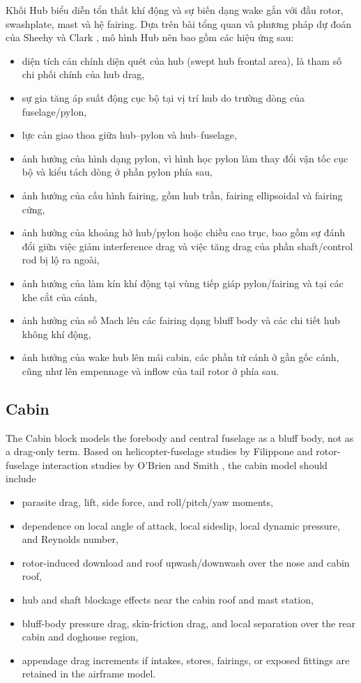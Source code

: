 \documentclass[12pt,a4paper]{article}
\begin{document}
Khối Hub biểu diễn tổn thất khí động và sự biến dạng wake gắn với đầu rotor, swashplate, mast và hệ fairing. Dựa trên bài tổng quan và phương pháp dự đoán của Sheehy và Clark \cite{Sheehy1976}, mô hình Hub nên bao gồm các hiệu ứng sau:
\begin{itemize}
  \item diện tích cản chính diện quét của hub (swept hub frontal area), là tham số chi phối chính của hub drag,
  \item sự gia tăng áp suất động cục bộ tại vị trí hub do trường dòng của fuselage/pylon,
  \item lực cản giao thoa giữa hub--pylon và hub--fuselage,
  \item ảnh hưởng của hình dạng pylon, vì hình học pylon làm thay đổi vận tốc cục bộ và kiểu tách dòng ở phần pylon phía sau,
  \item ảnh hưởng của cấu hình fairing, gồm hub trần, fairing ellipsoidal và fairing cứng,
  \item ảnh hưởng của khoảng hở hub/pylon hoặc chiều cao trục, bao gồm sự đánh đổi giữa việc giảm interference drag và việc tăng drag của phần shaft/control rod bị lộ ra ngoài,
  \item ảnh hưởng của làm kín khí động tại vùng tiếp giáp pylon/fairing và tại các khe cắt của cánh,
  \item ảnh hưởng của số Mach lên các fairing dạng bluff body và các chi tiết hub không khí động,
  \item ảnh hưởng của wake hub lên mái cabin, các phần tử cánh ở gần gốc cánh, cũng như lên empennage và inflow của tail rotor ở phía sau.
\end{itemize}

\subsection{Cabin}

The Cabin block models the forebody and central fuselage as a bluff body, not as a drag-only term. Based on helicopter-fuselage studies by Filippone \cite{Filippone2007} and rotor-fuselage interaction studies by O'Brien and Smith \cite{OBrien2005}, the cabin model should include
\begin{itemize}
  \item parasite drag, lift, side force, and roll/pitch/yaw moments,
  \item dependence on local angle of attack, local sideslip, local dynamic pressure, and Reynolds number,
  \item rotor-induced download and roof upwash/downwash over the nose and cabin roof,
  \item hub and shaft blockage effects near the cabin roof and mast station,
  \item bluff-body pressure drag, skin-friction drag, and local separation over the rear cabin and doghouse region,
  \item appendage drag increments if intakes, stores, fairings, or exposed fittings are retained in the airframe model.
\end{itemize}
\end{document}
